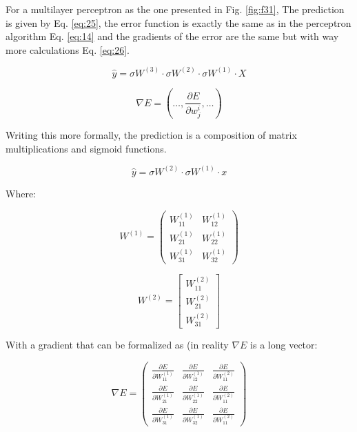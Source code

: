 \documentclass{article}
\begin{document}
For a multilayer perceptron as the one presented in Fig. \ref{fig:f31}, The prediction is given by Eq. \eqref{eq:25}, the error function is exactly the same as in the perceptron algorithm Eq. \eqref{eq:14} and the gradients of the error are the same but with way more calculations Eq. \eqref{eq:26}.
    
\begin{equation}
\label{eq:25}
\hat{y} = \sigma W^{(3)} \cdot \sigma W^{(2)} \cdot \sigma W^{(1)} \cdot X
\end{equation}

\begin{equation}
\label{eq:26}
\nabla E = (\dots, \frac{\partial E}{\partial w_j^i}, \dots)
\end{equation}
    
Writing this more formally, the prediction is a composition of matrix multiplications and sigmoid functions.

\[\hat{y} = \sigma W^{(2)} \cdot \sigma W^{(1)} \cdot x\]

Where: 

\[ W^{(1)} = \begin{pmatrix}
                                W_{11}^{(1)} & W_{12}^{(1)} \\
                                W_{21}^{(1)} & W_{22}^{(1)} \\
                                W_{31}^{(1)} & W_{32}^{(1)}
                                \end{pmatrix} \]

\[ W^{(2)} = \begin{bmatrix}
               W_{11}^{(2)} \\
               W_{21}^{(2)} \\
               W_{31}^{(2)}
             \end{bmatrix}\]
                                
With a gradient that can be formalized as (in reality \(\nabla E\) is a long vector: 

\[ \nabla E = \begin{pmatrix}
                                \frac{\partial E}{\partial W_{11}^{(1)}} & \frac{\partial E}{\partial W_{12}^{(1)}} & \frac{\partial E}{\partial W_{11}^{(2)}} \\
                                \frac{\partial E}{\partial W_{21}^{(1)}} & \frac{\partial E}{\partial W_{22}^{(1)}} & \frac{\partial E}{\partial W_{11}^{(2)}} \\
                                \frac{\partial E}{\partial W_{31}^{(1)}} & \frac{\partial E}{\partial W_{32}^{(1)}} & \frac{\partial E}{\partial W_{11}^{(2)}} 
                                \end{pmatrix} \]
                                
\end{document}
